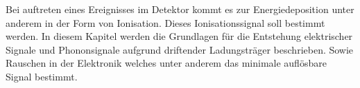 Bei auftreten eines Ereignisses im Detektor kommt es zur Energiedeposition unter anderem in der Form von Ionisation.
Dieses Ionisationssignal soll bestimmt werden.
In diesem Kapitel werden die Grundlagen für die Entstehung elektrischer Signale und Phononsignale aufgrund driftender Ladungsträger beschrieben.
Sowie Rauschen in der Elektronik welches unter anderem das minimale auflösbare Signal bestimmt.